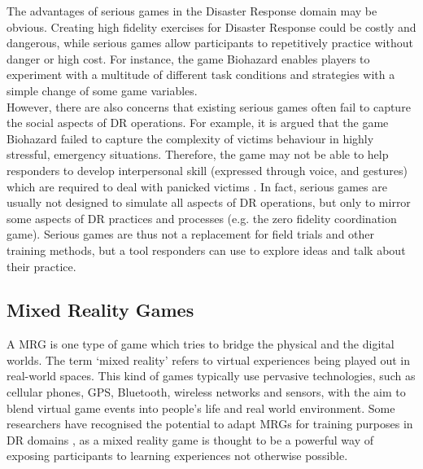The advantages of serious games in the Disaster Response domain may be obvious. Creating high fidelity exercises for Disaster Response could be costly and dangerous, while serious games allow participants to repetitively practice without danger or high cost. For instance, the game Biohazard \citep{Susi2007} enables players to experiment with a multitude of different task conditions and strategies with a simple change of some game variables.\\

However, there are also concerns that existing serious games often fail to capture the social aspects of \ac{DR} operations. For example, it is argued that the game Biohazard failed to capture the complexity of victims behaviour in highly stressful, emergency situations. Therefore, the game may not be able to help responders to develop interpersonal skill (expressed through voice, and gestures) which are required to deal with panicked victims \citep{Susi2007}. In fact, serious games are usually not designed to simulate all aspects of \ac{DR} operations, but only to mirror some aspects of \ac{DR} practices and processes (e.g. the zero fidelity coordination game). Serious games are thus not a replacement for field trials and other training methods, but a tool responders can use to explore ideas and talk about their practice.\\


\subsection{Mixed Reality Games}
A \acf{MRG} is one type of game which tries to bridge the physical and the digital \citep{Benford2005} worlds. The term `mixed reality' refers to virtual experiences being played out in real-world spaces. This kind of games typically use pervasive technologies, such as cellular phones, GPS, Bluetooth, wireless networks and sensors, with the aim to blend virtual game events into people's life and real world environment. Some researchers have recognised the potential to adapt \ac{MRG}s for training purposes in \ac{DR} domains \citep{Fischer2012}, as a mixed reality game is thought to be a powerful way of exposing participants to learning experiences not otherwise possible. \\

